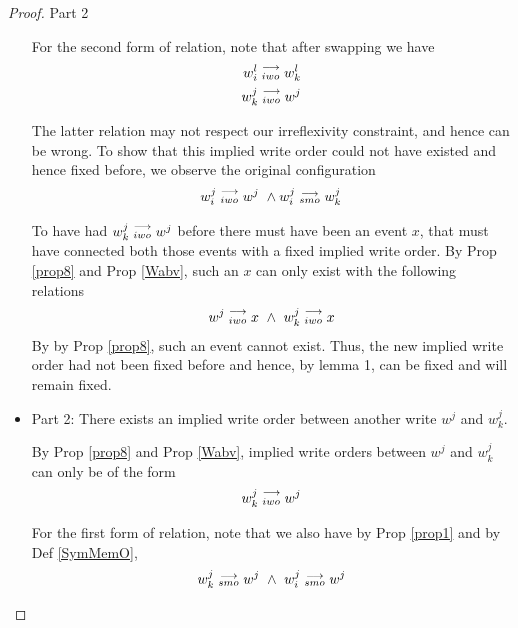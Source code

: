 \begin{proof}{Part 2}
\begin{itemize}
                        For the second form of relation, note that after swapping we have 
                        \begin{align*}
                            w_i^l\stackrel{\longrightarrow}{_{iwo}}w_k^l \\ 
                            w_k^j\stackrel{\longrightarrow}{_{iwo}}w^j    
                        \end{align*}

                        The latter relation may not respect our irreflexivity constraint, and hence can be wrong. To show that this implied write order could not have existed and hence fixed before, we observe the original configuration
                        \begin{align*}
                            w_i^j\stackrel{\longrightarrow}{_{iwo}}w^j \ \wedge w_i^j\stackrel{\longrightarrow}{_{smo}}w_k^j
                        \end{align*}

                        To have had $w_k^j\stackrel{\longrightarrow}{_{iwo}}w^j$ before there must have been an event $x$, that must have connected both those events with a fixed implied write order. By Prop \ref{prop8} and Prop \ref{Wabv}, such an $x$ can only exist with the following relations
                        \begin{align*}
                            \reln{w^j}{iwo}{x} \ \wedge \ \reln{w_k^j}{iwo}{x}                            
                        \end{align*} 
                        By by Prop \ref{prop8}, such an event cannot exist. Thus, the new implied write order had not been fixed before and hence, by lemma 1, can be fixed and will remain fixed. 

                    \item Part 2: There exists an implied write order between another write $w^j$ and $w_k^j$.
                        
                        By Prop \ref{prop8} and Prop \ref{Wabv}, implied write orders between $w^j$ and $w_k^j$ can only be of the form 
                        \begin{align*}
                            w_k^j\stackrel{\longrightarrow}{_{iwo}}w^j
                        \end{align*}
                        
                        For the first form of relation, note that we also have by Prop \ref{prop1} and by Def \ref{SymMemO}, 
                        \begin{align*}
                            \reln{w_k^j}{smo}{w^j} \ \wedge \ \reln{w_i^j}{smo}{w^j}
                        \end{align*}


\end{itemize}
\end{proof}
